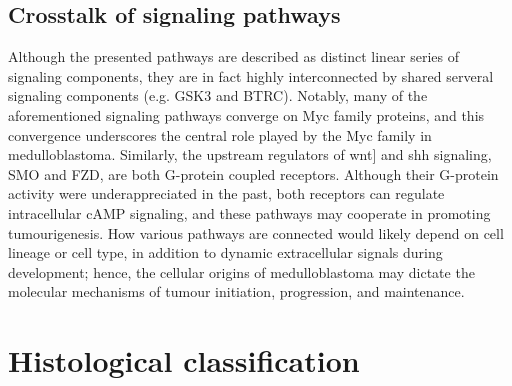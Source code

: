 %
%
%
%
%


\subsection{Crosstalk of signaling pathways}

Although the presented pathways are described as distinct linear series of signaling components, they are in fact highly interconnected by shared serveral signaling components (e.g. GSK3 and BTRC). Notably, many of the aforementioned signaling pathways converge on Myc family proteins, and this convergence underscores the central role played by the Myc family in medulloblastoma. Similarly, the upstream regulators of \gls{wnt}] and \gls{shh} signaling, SMO and FZD, are both G-protein coupled receptors. Although their G-protein activity were underappreciated in the past, both receptors can regulate intracellular cAMP signaling, and these pathways may cooperate in promoting tumourigenesis. How various pathways are connected would likely depend on cell lineage or cell type, in addition to dynamic extracellular signals during development; hence, the cellular origins of medulloblastoma may dictate the molecular mechanisms of tumour initiation, progression, and maintenance.


\section{Histological classification}

